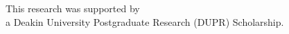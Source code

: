 \newpage
\thispagestyle{empty}
\vspace*{\fill}
{
  \centering
  \large
  This research was supported by \\ a Deakin University Postgraduate Research (DUPR) Scholarship.
  \par
}
\vspace*{\fill}
